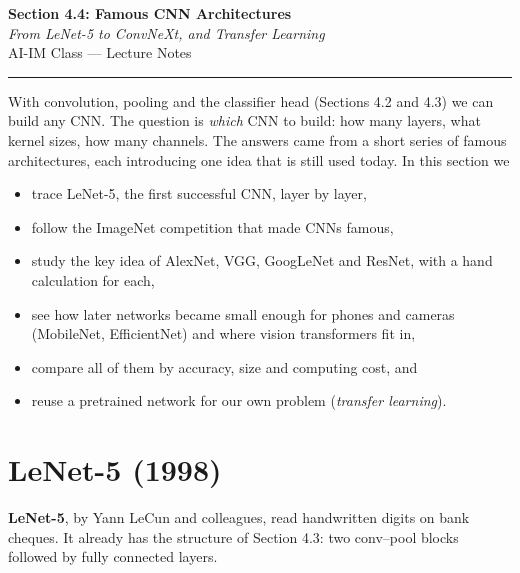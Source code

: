 \documentclass[12pt, a4paper]{article}
\begin{document}
\begin{center}
  {\LARGE \textbf{Section 4.4: Famous CNN Architectures}} \\[0.3em]
  {\large\itshape From LeNet-5 to ConvNeXt, and Transfer Learning} \\[0.5em]
  {\large AI-IM Class --- Lecture Notes}%
  \ifstudentmode
  \fi
\end{center}

\vspace{1em}
\hrule
\vspace{1.5em}

With convolution, pooling and the classifier head (Sections 4.2 and 4.3) we
can build any CNN. The question is \emph{which} CNN to build: how many layers,
what kernel sizes, how many channels. The answers came from a short series of
famous architectures, each introducing one idea that is still used today.
In this section we
\begin{itemize}[nosep]
  \item trace LeNet-5, the first successful CNN, layer by layer,
  \item follow the ImageNet competition that made CNNs famous,
  \item study the key idea of AlexNet, VGG, GoogLeNet and ResNet, with a hand
        calculation for each,
  \item see how later networks became small enough for phones and cameras
        (MobileNet, EfficientNet) and where vision transformers fit in,
  \item compare all of them by accuracy, size and computing cost, and
  \item reuse a pretrained network for our own problem (\emph{transfer
          learning}).
\end{itemize}

\section{LeNet-5 (1998)}

\textbf{LeNet-5}, by Yann LeCun and colleagues, read handwritten digits on
bank cheques. It already has the structure of Section 4.3: two conv--pool
blocks followed by fully connected layers.
\end{document}
